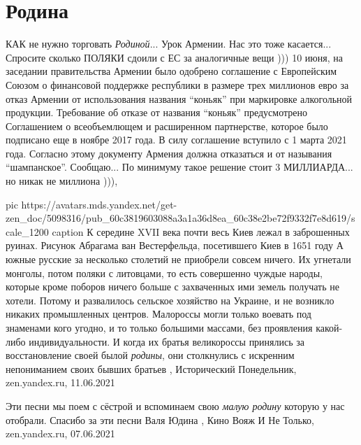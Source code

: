  
 
 
 
 
\chapter{Родина}

КАК не нужно торговать \emph{Родиной}...  Урок Армении. Нас это тоже
касается... Спросите сколько ПОЛЯКИ сдоили с ЕС за аналогичные вещи ))) 10
июня, на заседании правительства Армении было одобрено соглашение с Европейским
Союзом о финансовой поддержке республики в размере трех миллионов евро за отказ
Армении от использования названия \enquote{коньяк} при маркировке алкогольной
продукции.  Требование об отказе от названия \enquote{коньяк} предусмотрено Соглашением
о всеобъемлющем и расширенном партнерстве, которое было подписано еще в ноябре
2017 года. В силу соглашение вступило с 1 марта 2021 года.  Согласно этому
документу Армения должна отказаться и от называния \enquote{шампанское}.  Сообщаю... По
минимуму такое решение стоит 3 МИЛЛИАРДА... но никак не миллиона ))),

\ifcmt
	pic https://avatars.mds.yandex.net/get-zen_doc/5098316/pub_60c3819603088a3a1a36d8ea_60c38e2be72f9332f7e8d619/scale_1200
  caption К середине XVII века почти весь Киев лежал в заброшенных руинах. Рисунок Абрагама ван Вестерфельда, посетившего Киев в 1651 году
\fi
А южные русские за несколько столетий не приобрели совсем ничего. Их угнетали
монголы, потом поляки с литовцами, то есть совершенно чуждые народы, которые
кроме поборов ничего больше с захваченных ими земель получать не хотели. Потому
и развалилось сельское хозяйство на Украине, и не возникло никаких промышленных
центров. Малороссы могли только воевать под знаменами кого угодно, и то только
большими массами, без проявления какой-либо индивидуальности. И когда их братья
великороссы принялись за восстановление своей былой \emph{родины}, они столкнулись с
искренним непониманием своих бывших братьев
, 
Исторический Понедельник, zen.yandex.ru, 11.06.2021

Эти песни мы поем с сёстрой и вспоминаем свою \emph{малую родину} которую у нас отобрали. Спасибо за эти песни
Валя Юдина
, 
Кино Вояж И Не Только, zen.yandex.ru, 07.06.2021

